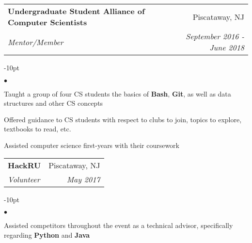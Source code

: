 \documentclass[12pt]{article}
\makeatletter
\newcommand{\subheading}[4]{
 	\vspace{5pt}
    	\begin{tabular*}{1.01\textwidth}
    		{l@{\extracolsep{\fill}}r}
      		\hspace{-16pt}\textbf{#1} & #2 \\
      		\hspace{-16pt}\textit{\small#3} & \textit{\small #4} \\
    	\end{tabular*}
    \vspace{-4pt}
}
\newenvironment{achievements}{
\begin{adjustwidth}{-10pt}{}
  \begin{list}{$\bullet$}{
  	\topsep 0pt \itemsep -4pt}}
  	{\vspace*{2pt}\end{list}
\end{adjustwidth}
}
\makeatother
\begin{document}
\subheading
	{Undergraduate Student Alliance of Computer Scientists}{Piscataway, NJ}
	{Mentor/Member}{September 2016 - June 2018}
	\begin{achievements}
		\item Taught a group of four CS students the basics of \textbf{Bash}, \textbf{Git}, as well as data structures and other CS concepts
		\item Offered guidance to CS students with respect to clubs to join, topics to explore, textbooks to read, etc.
		\item Assisted computer science first-years with their coursework
	\end{achievements}
	
\subheading
	{HackRU}{Piscataway, NJ}
	{Volunteer}{May 2017}
	\begin{achievements}
		\item Assisted competitors throughout the event as a technical advisor, specifically regarding \textbf{Python} and \textbf{Java}
	\end{achievements}
\end{document}
